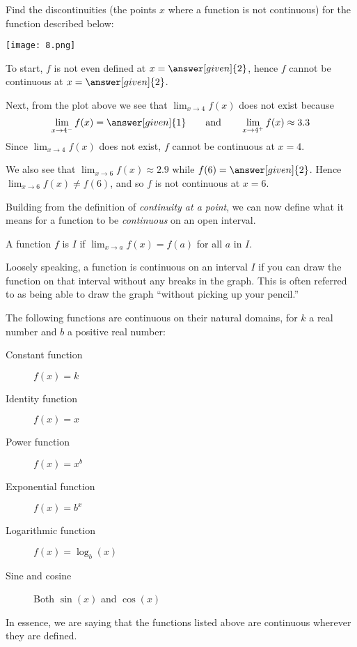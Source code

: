 \documentclass{ximera}
\begin{document}
\begin{example}
Find the discontinuities (the points $x$ where a function is not
continuous) for the function described below:
\begin{image}
  \texttt{[image: 8.png]}
\end{image}

\begin{explanation}
  To start, $f$ is not even defined at $x=\answer[given]{2}$, hence $f$
  cannot be continuous at $x=\answer[given]{2}$.

  Next, from the plot above we see that $\lim_{x\to 4} f(x)$ does not
  exist because
  \[
  \lim_{x\to 4^-}f(x) = \answer[given]{1}\qquad\text{and}\qquad \lim_{x\to 4^+}f(x) \approx 3.3
  \]
  Since $\lim_{x\to 4} f(x)$ does not exist, $f$ cannot be continuous
  at $x=4$.

  We also see that $\lim_{x\to 6} f(x) \approx
 2.9$ while $f(6) =
  \answer[given]{2}$. Hence $\lim_{x\to 6} f(x) \ne f(6)$, and so $f$
  is not continuous at $x=6$.
\end{explanation}
\end{example}


Building from the definition of \textit{continuity at a point}, we can
now define what it means for a function to be \textit{continuous} on
an open interval.

\begin{definition}
  A function $f$ is  $I$ if
  $\lim_{x\to a} f(x) = f(a)$ for all $a$ in $I$.
\end{definition}

Loosely speaking, a function is continuous on an interval $I$ if you
can draw the function on that interval without any breaks in the
graph.  This is often referred to as being able to draw the graph
``without picking up your pencil.''

\begin{theorem}\label{theorem:continuity}
The following functions are continuous on their natural domains, for $k$ a real number and $b$ a positive real number:
\begin{description}
\item[Constant function] $f(x) =k$
\item[Identity function] $f(x) = x$ 
\item[Power function] $f(x)=x^b$ 
\item[Exponential function] $f(x)=b^x$ 
\item[Logarithmic function] $f(x)=\log_b(x)$ 
\item[Sine and cosine] Both $\sin(x)$ and $\cos(x)$ 
\end{description}
In essence, we are saying that the functions listed above are
continuous wherever they are defined.

\end{theorem}
\end{document}
